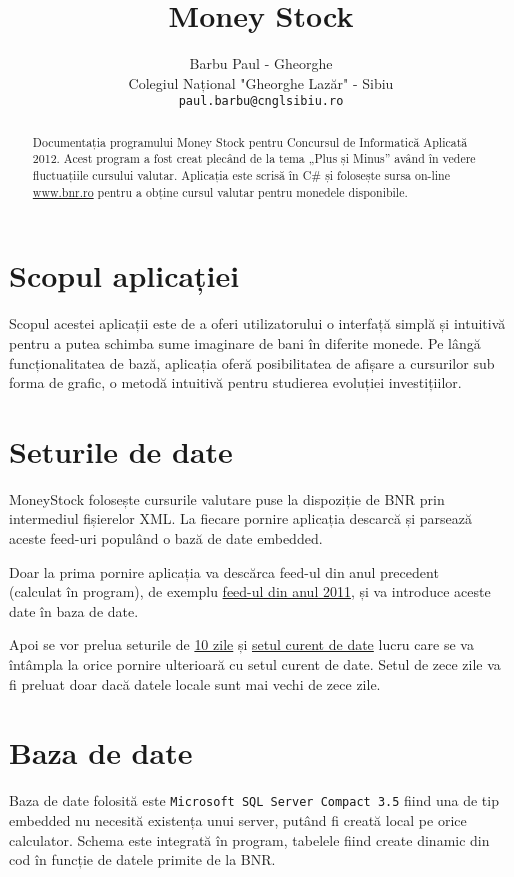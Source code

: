 \documentclass[13pt,a4paper]{report}
\begin{document}
\title{Money Stock}
\author{Barbu Paul - Gheorghe\\
Colegiul Național "Gheorghe Lazăr" - Sibiu\\
\texttt{paul.barbu@cnglsibiu.ro}}
\date{}
\maketitle

\begin{abstract}
Documentația programului Money Stock pentru Concursul de Informatică Aplicată
2012.
Acest program a fost creat plecând de la tema „Plus și Minus” având în vedere
fluctuațiile cursului valutar.
Aplicația este scrisă în C\# și folosește sursa on-line
\href{http://bnr.ro}{www.bnr.ro} pentru a
obține cursul valutar pentru monedele disponibile.
\end{abstract}

\section{Scopul aplicației}
Scopul acestei aplicații este de a oferi utilizatorului o interfață simplă și
intuitivă pentru a putea schimba sume imaginare de bani în diferite monede.
Pe lângă funcționalitatea de bază, aplicația oferă posibilitatea de afișare a
cursurilor sub forma de grafic, o metodă intuitivă pentru studierea evoluției
investițiilor.

\section{Seturile de date}
MoneyStock folosește cursurile valutare puse la dispoziție de BNR prin
intermediul fișierelor XML.
La fiecare pornire aplicația descarcă și parsează aceste feed-uri populând o bază
de date embedded.

Doar la prima pornire aplicația va descărca feed-ul din anul precedent \\ (calculat în
program), de exemplu
\href{http://bnr.ro/files/xml/years/nbrfxrates2011.xml}{feed-ul din anul 2011}, 
și va introduce aceste date în baza de date.

Apoi se vor prelua seturile de \href{http://bnr.ro/nbrfxrates10days.xml}{10
zile} și \href{http://bnr.ro/nbrfxrates.xml}{setul curent de date} lucru care se
va întâmpla la orice pornire ulterioară cu setul curent de date.
Setul de zece zile va fi preluat doar dacă datele locale sunt mai
vechi de zece zile.

\section{Baza de date}
Baza de date folosită este \texttt{Microsoft SQL Server Compact 3.5} fiind una de
tip embedded nu necesită existența unui server, putând fi creată local pe orice
calculator.
Schema este integrată în program, tabelele fiind create dinamic din cod în
funcție de datele primite de la BNR.
\end{document}
